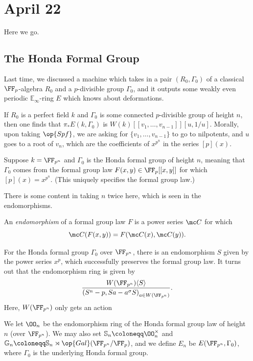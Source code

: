 \documentclass[../notes.tex]{subfiles}
\begin{document}
\section{April 22}
Here we go.

\subsection{The Honda Formal Group}
Last time, we discussed a machine which takes in a pair $(R_0,\Gamma_0)$ of a classical $\FF_p$-algebra $R_0$ and a $p$-divisible group $\Gamma_0$, and it outputs some weakly even periodic $\mathbb E_\infty$-ring $E$ which knows about deformations.
\begin{example}
	If $R_0$ is a perfect field $k$ and $\Gamma_0$ is some connected $p$-divisible group of height $n$, then one finds that $\pi_*E(k,\Gamma_0)$ is $W(k)[[v_1,\ldots,v_{n-1}]][u,1/u]$. Morally, upon taking $\op{Spf}$, we are asking for $\{v_1,\ldots,v_{n-1}\}$ to go to nilpotents, and $u$ goes to a root of $v_n$, which are the coefficients of $x^{p^n}$ in the series $[p](x)$.
\end{example}
\begin{example}[Honda]
	Suppose $k=\FF_{p^n}$ and $\Gamma_0$ is the Honda formal group of height $n$, meaning that $\Gamma_0$ comes from the formal group law $F(x,y)\in\FF_p[[x,y]]$ for which $[p](x)=x^{p^n}$. (This uniquely specifies the formal group law.)
\end{example}
There is some content in taking $n$ twice here, which is seen in the endomorphisms.
\begin{definition}[endomorphism]
	An \textit{endomorphism} of a formal group law $F$ is a power series $\mc C$ for which
	\[\mc C(F(x,y))=F(\mc C(x),\mc C(y)).\]
\end{definition}
\begin{example}
	For the Honda formal group $\Gamma_0$ over $\FF_{p^n}$, there is an endomorphism $S$ given by the power series $x^p$, which successfully preserves the formal group law. It turns out that the endomorphism ring is given by
	\[\frac{W(\FF_{p^n})\langle S\rangle}{\left(S^n-p,Sa-a^\sigma S\right)_{a\in W(\FF_{p^n})}}.\]
	Here, $W(\FF_{p^n})$ only gets an action
\end{example}
\begin{notation}
	We let $\OO_n$ be the endomorphism ring of the Honda formal group law of height $n$ (over $\FF_{p^n}$). We may also set $\mathbb S_n\coloneqq\OO_n^\times$ and $\mathbb G_n\coloneqq\mathbb S_n\rtimes\op{Gal}(\FF_{p^n}/\FF_p)$, and we define $E_n$ be $E(\FF_{p^n},\Gamma_0)$, where $\Gamma_0$ is the underlying Honda formal group.
\end{notation}
\end{document}
